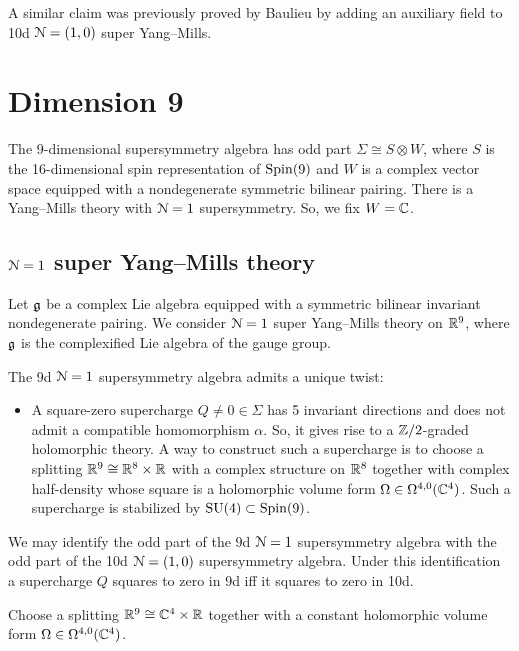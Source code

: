 \documentclass[10pt, oneside]{article}
\begin{document}
\begin{remark}
A similar claim was previously proved by Baulieu \cite{Baulieu} by adding an auxiliary field to 10d $\mathcal{N}=(1, 0)$ super Yang--Mills.
\end{remark}

\section{Dimension 9}

The 9-dimensional supersymmetry algebra has odd part $\Sigma\cong S\otimes W$, where $S$ is the 16-dimensional spin representation of $\mathrm{Spin}(9)$ and $W$ is a complex vector space equipped with a nondegenerate symmetric bilinear pairing. There is a Yang--Mills theory with $\mathcal{N}=1$ supersymmetry. So, we fix $W = \mathbb C$.

\subsection{$\mathcal N=1$ super Yang--Mills theory}

Let $\mathfrak g$ be a complex Lie algebra equipped with a symmetric bilinear invariant nondegenerate pairing. We consider $\mathcal N=1$ super Yang--Mills theory on $\mathbb R^9$, where $\mathfrak g$ is the complexified Lie algebra of the gauge group.

The 9d $\mathcal N=1$ supersymmetry algebra admits a unique twist:
\begin{itemize}
\item A square-zero supercharge $Q\neq 0\in\Sigma$ has 5 invariant directions and does not admit a compatible homomorphism $\alpha$. So, it gives rise to a $\mathbb Z/2$-graded holomorphic theory. A way to construct such a supercharge is to choose a splitting $\mathbb R^9\cong \mathbb R^8\times \mathbb R$ with a complex structure on $\mathbb R^8$ together with complex half-density whose square is a holomorphic volume form $\Omega\in\Omega^{4, 0}(\mathbb C^4)$. Such a supercharge is stabilized by $\mathrm{SU}(4)\subset \mathrm{Spin}(9)$.
\end{itemize}

We may identify the odd part of the 9d $\mathcal{N}=1$ supersymmetry algebra with the odd part of the 10d $\mathcal{N}=(1, 0)$ supersymmetry algebra. Under this identification a supercharge $Q$ squares to zero in 9d iff it squares to zero in 10d.

Choose a splitting $\mathbb R^9\cong\mathbb C^4\times \mathbb R$ together with a constant holomorphic volume form $\Omega\in\Omega^{4, 0}(\mathbb C^4)$.
\end{document}
